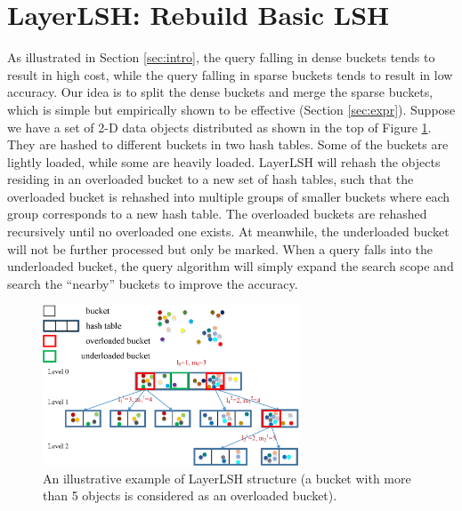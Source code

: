 \section{LayerLSH: Rebuild Basic LSH}
\label{sec:reclsh}



As illustrated in Section \ref{sec:intro}, the query falling in dense buckets tends to result in high cost, while the query falling in sparse buckets tends to result in low accuracy. Our idea is to split the dense buckets and merge the sparse buckets, which is simple but empirically shown to be effective (Section \ref{sec:expr}). Suppose we have a set of 2-D data objects distributed as shown in the top of Figure \ref{fig:overview}. They are hashed to different buckets in two hash tables. Some of the buckets are lightly loaded, while some are heavily loaded. LayerLSH will rehash the objects residing in an overloaded bucket to a new set of hash tables, such that the overloaded bucket is rehashed into multiple groups of smaller buckets where each group corresponds to a new hash table. The overloaded buckets are rehashed recursively until no overloaded one exists. At meanwhile, the underloaded bucket will not be further processed but only be marked. When a query falls into the underloaded bucket, the query algorithm will simply expand the search scope and search the ``nearby'' buckets to improve the accuracy.

\begin{figure}[t]
    \centerline{\includegraphics[width=3in]{fig/overview.eps}}
    \caption{An illustrative example of LayerLSH structure (a bucket with more than 5 objects is considered as an overloaded bucket).}
    \label{fig:overview}
\end{figure}

